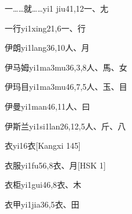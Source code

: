 \begin{entry}{一……就……}{yi1 jiu4}{1,12}{⼀、⼪}
\end{entry}

\begin{entry}{一行}{yi1xing2}{1,6}{⼀、⾏}
\end{entry}

\begin{entry}{伊朗}{yi1lang3}{6,10}{⼈、⽉}
\end{entry}

\begin{entry}{伊马姆}{yi1ma3mu3}{6,3,8}{⼈、⾺、⼥}
\end{entry}

\begin{entry}{伊玛目}{yi1ma3mu4}{6,7,5}{⼈、⽟、⽬}
\end{entry}

\begin{entry}{伊曼}{yi1man4}{6,11}{⼈、⽈}
\end{entry}

\begin{entry}{伊斯兰}{yi1si1lan2}{6,12,5}{⼈、⽄、⼋}
\end{entry}

\begin{entry}{衣}{yi1}{6}{⾐}[Kangxi 145]
\end{entry}

\begin{entry}{衣服}{yi1fu5}{6,8}{⾐、⽉}[HSK 1]
\end{entry}

\begin{entry}{衣柜}{yi1gui4}{6,8}{⾐、⽊}
\end{entry}

\begin{entry}{衣甲}{yi1jia3}{6,5}{⾐、⽥}
\end{entry}

